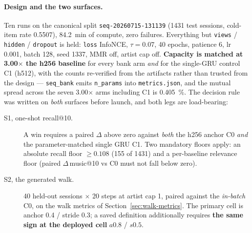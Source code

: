 \documentclass[11pt]{article}
\newcommand{\dsid}[1]{\texttt{\small #1}}
\begin{document}
\paragraph{Design and the two surfaces.} Ten runs on the canonical split
\dsid{seq-20260715-131139} (\num{1431} test sessions, cold-item rate
\num{0.5507}), \SI{84.2}{\minute} of compute, zero failures. Everything but
\texttt{views} / \texttt{hidden} / \texttt{dropout} is held: \texttt{loss}
InfoNCE, $\tau=\num{0.07}$, \num{40} epochs, patience \num{6}, lr \num{0.001},
batch \num{128}, seed \num{1337}, MMR off, artist cap off. \textbf{Capacity is
matched at \num{3.00}$\times$ the h256 baseline} for every bank arm \emph{and}
for the single-GRU control C1 (h512), with the counts re-verified from the
artifacts rather than trusted from the design --- \texttt{seq\_bank} emits
\texttt{n\_params} into \texttt{metrics.json}, and the mutual spread across the
seven \num{3.00}$\times$ arms including C1 is \SI{0.405}{\percent}. The decision
rule was written on \emph{both} surfaces before launch, and both legs are
load-bearing:
\begin{description}
  \item[S1, one-shot recall@10.] A win requires a paired $\Delta$ above zero
  against \emph{both} the h256 anchor C0 \emph{and} the parameter-matched single
  GRU C1. Two mandatory floors apply: an absolute recall floor
  $\ge\num{0.108}$ (\num{155} of \num{1431}) and a per-baseline relevance floor
  (paired $\Delta$\,music@10 vs C0 must not fall below zero).
  \item[S2, the generated walk.] \num{40} held-out sessions $\times$ \num{20}
  steps at artist cap 1, paired against the \emph{in-batch} C0, on the walk
  metrics of Section~\ref{sec:walk-metrics}. The primary cell is anchor
  \num{0.4} / stride \num{0.3}; a saved definition additionally requires
  \textbf{the same sign at the deployed cell} $a\num{0.8}$ / $s\num{0.5}$.
\end{description}
\end{document}
